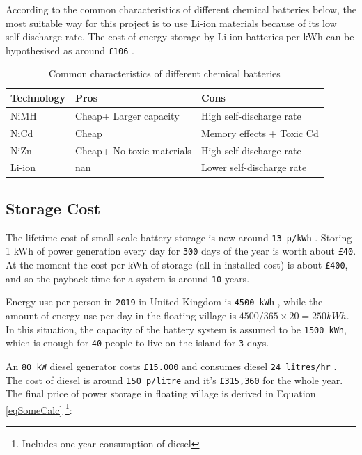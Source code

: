 \documentclass[11pt]{article}
\numberwithin{equation}{section}
\begin{document}
According to the common characteristics of different chemical batteries below, the most suitable way for this project is to use Li-ion materials because of its low self-discharge rate. The cost of energy storage by Li-ion batteries per kWh can be hypothesised as around \texttt{£106} \cite{123}.

\begin{table}[H]
\caption{\label{CharacteristicsOfBatteries}Common characteristics of different chemical batteries}
\centering
\begin{tabular}{lll}
\toprule
Technology & Pros\xa0 & Cons\\
\midrule
NiMH & Cheap+ Larger capacity & High self-discharge rate\\
NiCd & Cheap & Memory effects + Toxic Cd  \footnotemark\\
NiZn & Cheap+ No toxic materials & High self-discharge rate\\
Li-ion & nan & Lower self-discharge rate\\
\bottomrule
\end{tabular}
\end{table}
\subsection{Storage Cost}
\label{sec:org286e958}
The lifetime cost of small-scale battery storage is now around \texttt{13 p/kWh} \cite{1234}. Storing 1 kWh of power generation every day for \texttt{300} days of the year is worth about \texttt{£40}. At the moment the cost per kWh of storage (all-in installed cost) is about \texttt{£400}, and so the payback time for a system is around \texttt{10} years.

Energy use per person in \texttt{2019} in United Kingdom is \texttt{4500 kWh} \cite{12345}, while the amount of energy use per day in the floating village is \(4500/365 \times 20 = 250 kWh\). In this situation, the capacity of the battery system is assumed to be \texttt{1500 kWh}, which is enough for \texttt{40} people to live on the island for \texttt{3} days.

An \texttt{80 kW} diesel generator costs \texttt{£15.000} \cite{123abc} and consumes diesel \texttt{24 litres/hr} \cite{123bcd}. The cost of diesel is around \texttt{150 p/litre} \cite{123cde} and it’s \texttt{£315,360} for the whole year. The final price of power storage in floating village is derived in Equation \ref{eqSomeCalc} \footnote{Includes one year consumption of diesel}:
\end{document}
